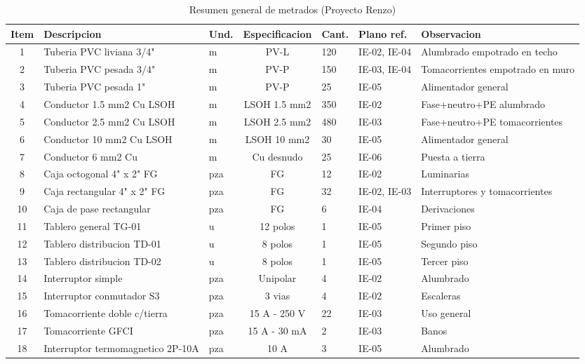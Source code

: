 \begin{landscape}
\begin{table}[H]
\centering
\tiny
\caption{Resumen general de metrados (Proyecto Renzo)}
\label{tab:resumen-metrados}
\begin{tabularx}{\textwidth}{c L{4.8cm} L{2.2cm} c L{1.8cm} L{3.0cm} Y}
\toprule
\textbf{Item} & \textbf{Descripcion} & \textbf{Und.} & \textbf{Especificacion} & \textbf{Cant.} & \textbf{Plano ref.} & \textbf{Observacion} \\
 & Tuberia PVC liviana 3/4" & m & PV-L & 120 & IE-02, IE-04 & Alumbrado empotrado en techo \\
2 & Tuberia PVC pesada 3/4" & m & PV-P & 150 & IE-03, IE-04 & Tomacorrientes empotrado en muro \\
3 & Tuberia PVC pesada 1" & m & PV-P & 25 & IE-05 & Alimentador general \\
4 & Conductor 1.5 mm2 Cu LSOH & m & LSOH 1.5 mm2 & 350 & IE-02 & Fase+neutro+PE alumbrado \\
5 & Conductor 2.5 mm2 Cu LSOH & m & LSOH 2.5 mm2 & 480 & IE-03 & Fase+neutro+PE tomacorrientes \\
6 & Conductor 10 mm2 Cu LSOH & m & LSOH 10 mm2 & 30 & IE-05 & Alimentador general \\
7 & Conductor 6 mm2 Cu & m & Cu desnudo & 25 & IE-06 & Puesta a tierra \\
8 & Caja octogonal 4" x 2" FG & pza & FG & 12 & IE-02 & Luminarias \\
9 & Caja rectangular 4" x 2" FG & pza & FG & 32 & IE-02, IE-03 & Interruptores y tomacorrientes \\
10 & Caja de pase rectangular & pza & FG & 6 & IE-04 & Derivaciones \\
11 & Tablero general TG-01 & u & 12 polos & 1 & IE-05 & Primer piso \\
12 & Tablero distribucion TD-01 & u & 8 polos & 1 & IE-05 & Segundo piso \\
13 & Tablero distribucion TD-02 & u & 8 polos & 1 & IE-05 & Tercer piso \\
14 & Interruptor simple & pza & Unipolar & 4 & IE-02 & Alumbrado \\
15 & Interruptor conmutador S3 & pza & 3 vias & 4 & IE-02 & Escaleras \\
16 & Tomacorriente doble c/tierra & pza & 15 A - 250 V & 22 & IE-03 & Uso general \\
17 & Tomacorriente GFCI & pza & 15 A - 30 mA & 2 & IE-03 & Banos \\
18 & Interruptor termomagnetico 2P-10A & pza & 10 A & 3 & IE-05 & Alumbrado \\

\end{tabularx}
\end{table}
\end{landscape}
